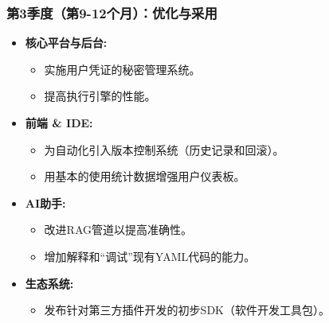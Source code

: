 \documentclass[11pt, a4paper, oneside]{article}
\begin{document}
\subsubsection*{第3季度（第9-12个月）：优化与采用}
\begin{itemize}[leftmargin=*]
    \item \textbf{核心平台与后台:}
    \begin{itemize}




        \item 实施用户凭证的秘密管理系统。
        \item 提高执行引擎的性能。
    \end{itemize}
    \item \textbf{前端 \& IDE:}
    \begin{itemize}
        \item 为自动化引入版本控制系统（历史记录和回滚）。
        \item 用基本的使用统计数据增强用户仪表板。
    \end{itemize}
    \item \textbf{AI助手:}
    \begin{itemize}
        \item 改进RAG管道以提高准确性。
        \item 增加解释和“调试”现有YAML代码的能力。
    \end{itemize}
    \item \textbf{生态系统:}
    \begin{itemize}
        \item 发布针对第三方插件开发的初步SDK（软件开发工具包）。
    \end{itemize}
\end{itemize}
\end{document}
